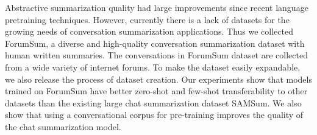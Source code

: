 Abstractive summarization quality had large improvements since recent language pretraining techniques. However, currently there is a lack of datasets for the growing needs of conversation summarization applications. Thus we collected ForumSum, a diverse and high-quality conversation summarization dataset with human written summaries. The conversations in ForumSum dataset are collected from a wide variety of internet forums. To make the dataset easily expandable, we also release the process of dataset creation. Our experiments show that models trained on ForumSum have better zero-shot and few-shot transferability to other datasets than the existing large chat summarization dataset SAMSum. We also show that using a conversational corpus for pre-training improves the quality of the chat summarization model.
